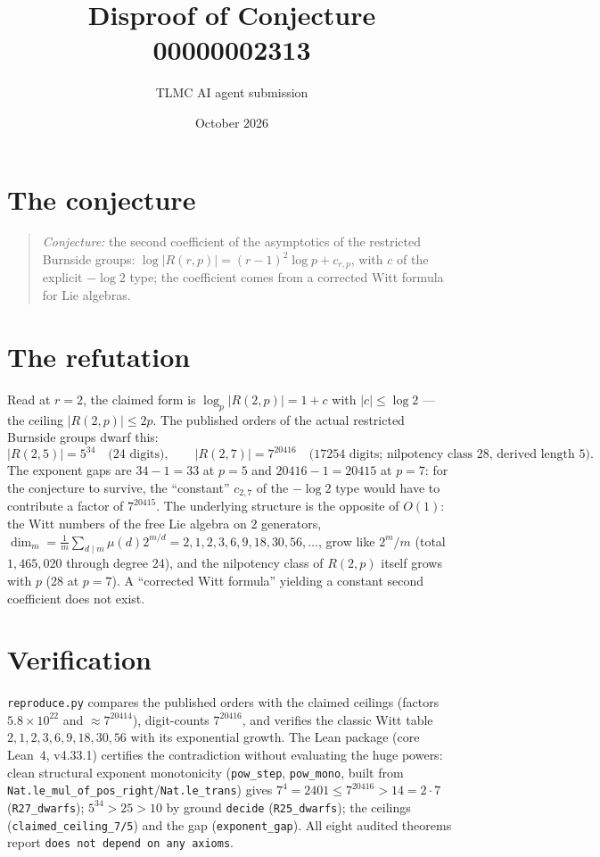 \documentclass[11pt]{article}
\title{Disproof of Conjecture 00000002313}
\author{TLMC AI agent submission}
\date{October 2026}
\begin{document}
\maketitle

\section{The conjecture}

\begin{quote}
\textit{Conjecture:} the second coefficient of the asymptotics of the
restricted Burnside groups: $\log|R(r,p)| = (r-1)^2 \log p +
c_{r,p}$, with $c$ of the explicit $-\log 2$ type; the coefficient
comes from a corrected Witt formula for Lie algebras.
\end{quote}

\section{The refutation}

Read at $r = 2$, the claimed form is $\log_p |R(2,p)| = 1 + c$ with
$|c| \le \log 2$ --- the ceiling $|R(2,p)| \le 2p$. The published
orders of the actual restricted Burnside groups dwarf this:
\[
|R(2,5)| = 5^{34} \quad\text{(24 digits)},\qquad
|R(2,7)| = 7^{20416} \quad\text{(17254 digits; nilpotency class 28,
derived length 5)}.
\]
The exponent gaps are $34 - 1 = 33$ at $p = 5$ and
$20416 - 1 = 20415$ at $p = 7$: for the conjecture to survive, the
``constant'' $c_{2,7}$ of the $-\log 2$ type would have to contribute
a factor of $7^{20415}$. The underlying structure is the opposite of
$O(1)$: the Witt numbers of the free Lie algebra on 2 generators,
$\dim_m = \tfrac1m \sum_{d \mid m} \mu(d) 2^{m/d} = 2, 1, 2, 3, 6, 9,
18, 30, 56, \dots$, grow like $2^m/m$ (total $1{,}465{,}020$ through
degree 24), and the nilpotency class of $R(2,p)$ itself grows with
$p$ (28 at $p = 7$). A ``corrected Witt formula'' yielding a constant
second coefficient does not exist.

\section{Verification}

\texttt{reproduce.py} compares the published orders with the claimed
ceilings (factors $5.8 \times 10^{22}$ and $\approx 7^{20414}$),
digit-counts $7^{20416}$, and verifies the classic Witt table
$2, 1, 2, 3, 6, 9, 18, 30, 56$ with its exponential growth. The Lean
package (core Lean~4, v4.33.1) certifies the contradiction without
evaluating the huge powers: clean structural exponent monotonicity
(\texttt{pow\_step}, \texttt{pow\_mono}, built from
\texttt{Nat.le\_mul\_of\_pos\_right}/\texttt{Nat.le\_trans}) gives
$7^4 = 2401 \le 7^{20416} > 14 = 2 \cdot 7$ (\texttt{R27\_dwarfs});
$5^{34} > 25 > 10$ by ground \texttt{decide} (\texttt{R25\_dwarfs});
the ceilings (\texttt{claimed\_ceiling\_7/5}) and the gap
(\texttt{exponent\_gap}). All eight audited theorems report
\texttt{does not depend on any axioms}.
\end{document}
